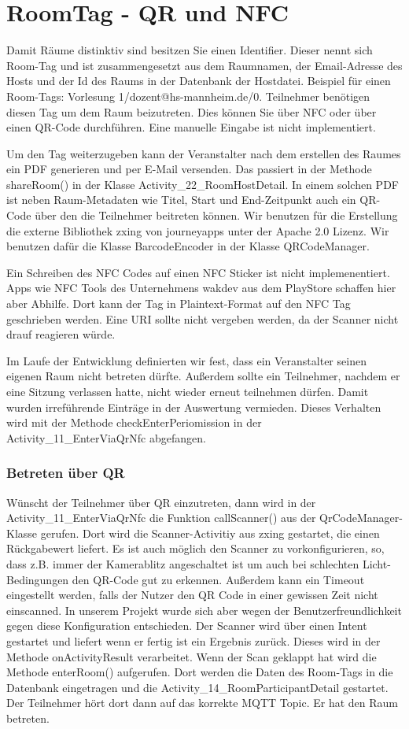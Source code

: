 \section{RoomTag - QR und NFC}
\label{sec:RoomTag - QR und NFC}
Damit Räume distinktiv sind besitzen Sie einen Identifier. Dieser nennt sich Room-Tag und ist zusammengesetzt aus dem Raumnamen, der Email-Adresse des Hosts und der Id des Raums in der Datenbank der Hostdatei. Beispiel für einen Room-Tags: Vorlesung 1/dozent@hs-mannheim.de/0.
Teilnehmer benötigen diesen Tag um dem Raum beizutreten. Dies können Sie über NFC oder über einen QR-Code durchführen. Eine manuelle Eingabe ist nicht implementiert.

Um den Tag weiterzugeben kann der Veranstalter nach dem erstellen des Raumes ein PDF generieren und per E-Mail versenden. 
Das passiert in der Methode shareRoom() in der Klasse Activity\_22\_RoomHostDetail. 
In einem solchen PDF ist neben Raum-Metadaten wie Titel, Start und End-Zeitpunkt auch ein QR-Code über den die Teilnehmer beitreten können. 
Wir benutzen für die Erstellung die externe Bibliothek zxing von journeyapps unter der Apache 2.0 Lizenz. Wir benutzen dafür die Klasse BarcodeEncoder in der Klasse QRCodeManager.

Ein Schreiben des NFC Codes auf einen NFC Sticker ist nicht implemenentiert.
 Apps wie NFC Tools des Unternehmens wakdev aus dem PlayStore schaffen hier aber Abhilfe. Dort kann der Tag in Plaintext-Format auf den NFC Tag geschrieben werden.
Eine URI sollte nicht vergeben werden, da der Scanner nicht drauf reagieren würde.

Im Laufe der Entwicklung definierten wir fest, dass ein Veranstalter seinen eigenen Raum nicht betreten dürfte. Außerdem sollte ein Teilnehmer, nachdem er eine Sitzung verlassen hatte, nicht wieder erneut teilnehmen dürfen. Damit wurden irreführende Einträge in der Auswertung vermieden. Dieses Verhalten wird mit der Methode checkEnterPeriomission in der Activity\_11\_EnterViaQrNfc abgefangen.
\subsubsection*{Betreten über QR}
\label{subsec: Betreten über QR}
Wünscht der Teilnehmer über QR einzutreten, dann wird in der Activity\_11\_EnterViaQrNfc die Funktion callScanner() aus der QrCodeManager-Klasse gerufen. Dort wird die Scanner-Activitiy aus zxing gestartet, die einen Rückgabewert liefert. Es ist auch möglich den Scanner zu vorkonfigurieren, so, dass z.B. immer der Kamerablitz angeschaltet ist um auch bei schlechten Licht-Bedingungen den QR-Code gut zu erkennen. 
Außerdem kann ein Timeout eingestellt werden, falls der Nutzer den QR Code in einer gewissen Zeit nicht einscanned.
In unserem Projekt wurde sich aber wegen der Benutzerfreundlichkeit gegen diese Konfiguration entschieden.
Der Scanner wird über einen Intent gestartet und liefert wenn er fertig ist ein Ergebnis zurück.
Dieses wird in der Methode onActivityResult verarbeitet. Wenn der Scan geklappt hat wird die Methode enterRoom() aufgerufen. Dort werden die Daten des Room-Tags in die Datenbank eingetragen und die Activity\_14\_RoomParticipantDetail gestartet. Der Teilnehmer hört dort dann auf das korrekte MQTT Topic. Er hat den Raum betreten.
